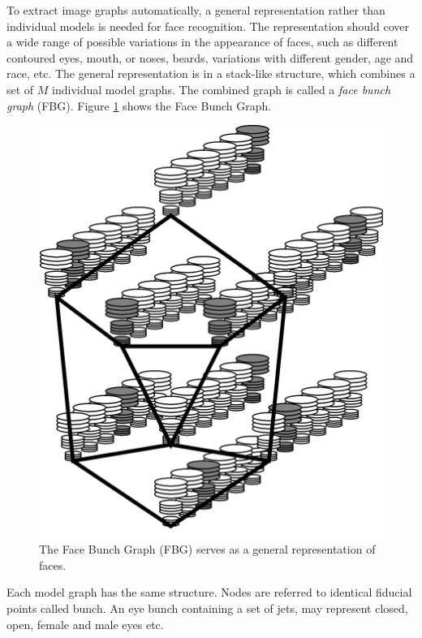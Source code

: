 To extract image graphs automatically, a general representation rather than individual models is needed for face recognition. The representation should cover a wide range of possible variations in the appearance of faces, such as different contoured eyes, mouth, or noses, beards, variations with different gender, age and race, etc. The general representation is in a stack-like structure, which combines a set of $M$ individual model graphs. The combined graph is called a \textit{face bunch graph} (FBG). \mbox{Figure} \ref{fig:FBG} shows the Face Bunch Graph.
\begin{figure}[ht]
 \begin{center}
  \includegraphics[scale=0.125]{ch2/figures/FBG.jpg}
  \caption{The Face Bunch Graph (FBG) serves as a general representation of faces. \cite{Wiskott1997}}
  \label{fig:FBG}
 \end{center}
\end{figure} 
Each model graph has the same structure. Nodes are referred to identical fiducial points called bunch. An eye bunch containing a set of jets, may represent closed, open, female and male eyes etc. 
